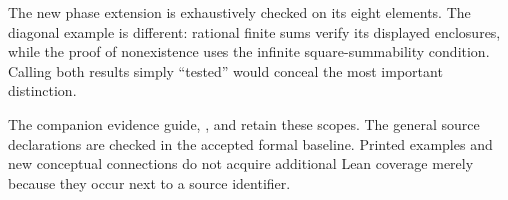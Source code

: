 The new phase extension is exhaustively checked on its eight elements. The diagonal example is different: rational finite sums verify its displayed enclosures, while the proof of nonexistence uses the infinite square-summability condition. Calling both results simply ``tested'' would conceal the most important distinction.

The companion evidence guide, , and  retain these scopes. The general source declarations are checked in the accepted formal baseline. Printed examples and new conceptual connections do not acquire additional Lean coverage merely because they occur next to a source identifier.
